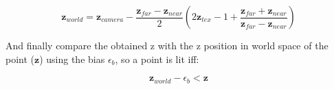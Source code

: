 \documentclass[12pt, twoside,a4paper]{article}
\begin{document}
$$
\mathbf{z}_{world} = \mathbf{z}_{camera} - \frac{\mathbf{z}_{far} - \mathbf{z}_{near}}{2} \left( 2 \mathbf{z}_{tex} - 1 + \frac{\mathbf{z}_{far} + \mathbf{z}_{near}}{\mathbf{z}_{far} - \mathbf{z}_{near}}\right)
$$
		
And finally compare the obtained z with the z position in world space of the point ($\mathbf{z}$) using the bias $\epsilon_b$, so a point is lit iff:

$$
\mathbf{z}_{world} - \epsilon_b < \mathbf{z}
$$		

\begin{figure}
\centering
{} 
\\
\end{figure}
\end{document}
